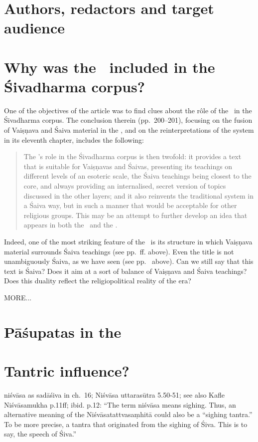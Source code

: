 \section{Authors, redactors and target audience}


\section{Why was the \VSS\ included in the Śivadharma corpus?}

One of the objectives of the article 
 was
to find clues about the r\^ole of the \VSS\ in the Śivadharma corpus.
The conclusion  therein (pp.~200--201), focusing on the fusion of 
Vaiṣṇava and Śaiva material in the \VSS, and on the reinterpretations of 
the  system in its eleventh chapter, includes the following:

\begin{quote}
The \Vss's role in the Śivadharma corpus is then twofold: 
it provides a text that is suitable for Vaiṣṇavas and Śaivas,
presenting its teachings on different levels of an esoteric scale, 
the Śaiva teachings being closest to the core, and always
providing an internalised, secret version of topics 
discussed in the other layers; and it also reinvents the traditional 
 system in a Śaiva way,
but in such a manner that would be acceptable for other religious groups. 
This may be an attempt to further develop an idea that appears in both 
the \SDhS\ and the \SDhU.
\end{quote}

\noindent
Indeed, one of the most striking feature of the \VSS\
is its structure in which Vaiṣṇava material surrounds
Śaiva teachings (see pp.~\pageref{structure}\thinspace ff. above). 
Even the title is not unambiguously Śaiva, as
we have seen (see pp.~\pageref{title} above).
Can we still say that this text is Śaiva? Does it
aim at a sort of balance of Vaiṣṇava and Śaiva
teachings? Does this duality reflect the 
religio\-political reality of the era?

MORE...

\section{Pāśupatas in the \VSS}

\section{Tantric influence?}
niśvāsa as sadāśiva in ch.~16; Niśvāsa uttarasūtra 5.50-51; see also Kafle Niśvāsamukha p.11ff; ibid. p.12: ``The term niśvāsa means sighing. Thus, an alternative meaning of the Niśvāsatattvasaṃhitā could also be a ``sighing tantra.'' To be more precise, a tantra that originated from the sighing of Śiva. This is to say, the speech of Śiva.''

